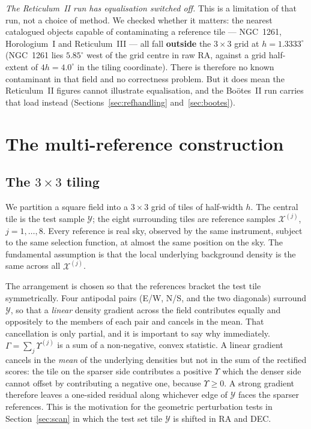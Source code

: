 \documentclass[11pt,a4paper]{article}
\newcommand{\Ycal}{\mathcal{Y}}              %
\newcommand{\Xcal}{\mathcal{X}}              %
\newcommand{\Ups}{\Upsilon}                  %
\newcommand{\Gam}{\Gamma}                    %
\newcommand{\Ups}{\Upsilon}
\newcommand{\Gam}{\Gamma}
\newcommand{\Ycal}{\mathcal{Y}}
\newcommand{\Xcal}{\mathcal{X}}
\newcommand{\dg}{^{\circ}}
\begin{document}
\emph{The Reticulum~II run has equalisation switched off.} This is a limitation of that run, not a
choice of method. We checked whether it matters: the nearest catalogued objects capable of
contaminating a reference tile --- NGC~1261, Horologium~I and Reticulum~III --- all fall
\textbf{outside} the $3\times3$ grid at $h = 1.3333\dg$ (NGC~1261 lies $5.85\dg$ west of the grid
centre in raw RA, against a grid half-extent of $4h = 4.0\dg$ in the tiling coordinate). There is
therefore no known contaminant in that field and no correctness problem. But it does mean the
Reticulum~II figures cannot illustrate equalisation, and the Bo\"otes~II run carries that load
instead (Sections~\ref{sec:refhandling} and~\ref{sec:bootes}).

\section{The multi-reference construction}
\label{sec:construction}

\subsection{The $3\times3$ tiling}
\label{sec:tiling}

We partition a square field into a $3\times3$ grid of tiles of half-width $h$. The central tile is
the test sample $\Ycal$; the eight surrounding tiles are reference samples $\Xcal^{(j)}$,
$j = 1,\dots,8$. Every reference is real sky, observed by the same instrument, subject to the same
selection function, at almost the same position on the sky. The fundamental assumption is that the local underlying background density is the same across all $\Xcal^{(j)}$. 

The arrangement is chosen so that the references bracket the test tile symmetrically. Four
antipodal pairs (E/W, N/S, and the two diagonals) surround $\Ycal$, so that a \emph{linear} density
gradient across the field contributes equally and oppositely to the members of each pair and
cancels in the mean. That cancellation is only partial, and it is important to say why immediately.
$\Gam = \sum_j \Ups^{(j)}$ is a sum of a non-negative, convex statistic. A linear gradient cancels
in the \emph{mean} of the underlying densities but not in the sum of the rectified scores: the tile on the sparser side contributes a positive $\Ups$ which the denser side cannot offset by
contributing a negative one, because $\Ups \ge 0$. A strong gradient therefore leaves a one-sided
residual along whichever edge of $\Ycal$ faces the sparser references. This is the motivation for
the geometric perturbation tests in Section~\ref{sec:scan} in which the test set tile $\Ycal$ is shifted in RA and DEC.
\end{document}
